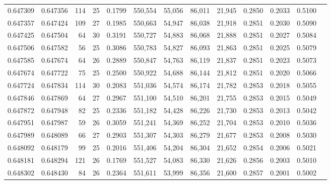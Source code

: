 \begin{tabular}{rrrrrrrrrrrrr}
0.647309 & 0.647356 & 114 &  25 &                                     0.1799 & 550,554 &  55,056 &  86,011 &  21,945 & 0.2850 & 0.2033 & 0.5100 \\
0.647357 & 0.647424 & 109 &  27 &                                     0.1985 & 550,663 &  54,947 &  86,038 &  21,918 & 0.2851 & 0.2030 & 0.5090 \\
0.647425 & 0.647504 &  64 &  30 &                                     0.3191 & 550,727 &  54,883 &  86,068 &  21,888 & 0.2851 & 0.2027 & 0.5084 \\
0.647506 & 0.647582 &  56 &  25 &                                     0.3086 & 550,783 &  54,827 &  86,093 &  21,863 & 0.2851 & 0.2025 & 0.5079 \\
0.647585 & 0.647674 &  64 &  26 &                                     0.2889 & 550,847 &  54,763 &  86,119 &  21,837 & 0.2851 & 0.2023 & 0.5073 \\
0.647674 & 0.647722 &  75 &  25 &                                     0.2500 & 550,922 &  54,688 &  86,144 &  21,812 & 0.2851 & 0.2020 & 0.5066 \\
0.647724 & 0.647834 & 114 &  30 &                                     0.2083 & 551,036 &  54,574 &  86,174 &  21,782 & 0.2853 & 0.2018 & 0.5055 \\
0.647846 & 0.647869 &  64 &  27 &                                     0.2967 & 551,100 &  54,510 &  86,201 &  21,755 & 0.2853 & 0.2015 & 0.5049 \\
0.647872 & 0.647948 &  82 &  25 &                                     0.2336 & 551,182 &  54,428 &  86,226 &  21,730 & 0.2853 & 0.2013 & 0.5042 \\
0.647951 & 0.647987 &  59 &  26 &                                     0.3059 & 551,241 &  54,369 &  86,252 &  21,704 & 0.2853 & 0.2010 & 0.5036 \\
0.647989 & 0.648089 &  66 &  27 &                                     0.2903 & 551,307 &  54,303 &  86,279 &  21,677 & 0.2853 & 0.2008 & 0.5030 \\
0.648092 & 0.648179 &  99 &  25 &                                     0.2016 & 551,406 &  54,204 &  86,304 &  21,652 & 0.2854 & 0.2006 & 0.5021 \\
0.648181 & 0.648294 & 121 &  26 &                                     0.1769 & 551,527 &  54,083 &  86,330 &  21,626 & 0.2856 & 0.2003 & 0.5010 \\
0.648302 & 0.648430 &  84 &  26 &                                     0.2364 & 551,611 &  53,999 &  86,356 &  21,600 & 0.2857 & 0.2001 & 0.5002 \\

\end{tabular}
